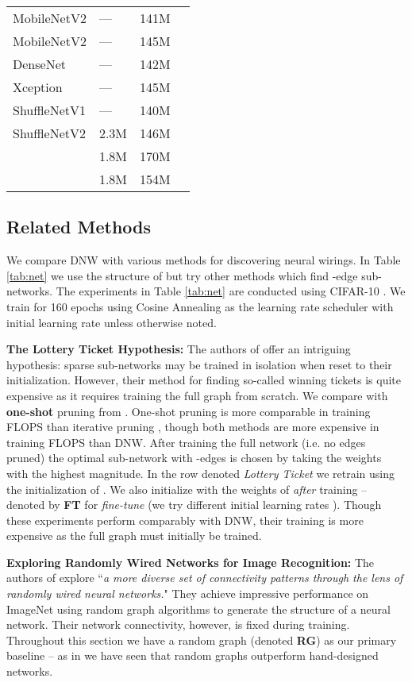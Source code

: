 \documentclass{article}
\newcommand*{\smn}{\text{MobileNetV1-DNW}}
\newcommand*{\rg}{\text{MobileNetV1-RG}}
\begin{document}
\begin{table}
\begin{tabular}{llll}
    MobileNetV2  & --- & 141M  &      \\
    MobileNetV2  & --- & 145M  &      \\
    DenseNet  & --- & 142M  &      \\
    Xception  & --- & 145M  &      \\
    ShuffleNetV1  & --- & 140M  &      \\
    ShuffleNetV2  & 2.3M & 146M  &      \\
    \rg  & 1.8M & 170M  &      \\
    \smn  & 1.8M & 154M  &      \\
    \bottomrule
  \end{tabular}
  \vspace{-1em}
\end{table}
\subsection{Related Methods}
We compare DNW with various methods for discovering neural wirings. In Table \ref{tab:net} we use the structure of  but try other methods which find -edge sub-networks. The experiments in Table \ref{tab:net} are conducted using CIFAR-10 \cite{cifar}. We train for 160 epochs using Cosine Annealing as the learning rate scheduler with initial learning rate  unless otherwise noted.

\textbf{The Lottery Ticket Hypothesis:} The authors of \cite{lth, lth2} offer an intriguing hypothesis: sparse sub-networks may be trained in isolation when reset to their initialization. However, their method for finding so-called winning tickets is quite expensive as it requires training the full graph from scratch. We compare with \textbf{one-shot} pruning from \cite{lth2}. One-shot pruning is more comparable in training FLOPS than iterative pruning \cite{lth}, though both methods are more expensive in training FLOPS than DNW. After training the full network  (i.e. no edges pruned) the optimal sub-network  with -edges is chosen by taking the weights with the highest magnitude. In the row denoted \textit{Lottery Ticket} we retrain  using the initialization of . We also initialize  with the weights of  \textit{after} training -- denoted by \textbf{FT} for \textit{fine-tune} (we try different initial learning rates ). Though these experiments perform comparably with DNW, their training is more expensive as the full graph must initially be trained.

\textbf{Exploring Randomly Wired Networks for Image Recognition:} The authors of \cite{randwire} explore ``\textit{a more diverse set of connectivity patterns through the lens of randomly wired neural networks.}" They achieve impressive performance on ImageNet \cite{imagenet} using random graph algorithms to generate the structure of a neural network. Their network connectivity, however, is fixed during training. Throughout this section we have a random graph (denoted \textbf{RG}) as our primary baseline -- as in \cite{randwire} we have seen that random graphs outperform hand-designed networks.
\end{document}
